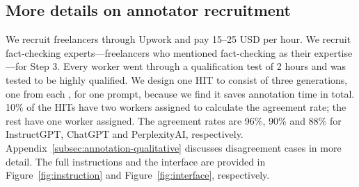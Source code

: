 \subsection{More details on annotator recruitment}\label{app:annotator-recruitment}
We recruit freelancers through Upwork and pay 15--25 USD per hour. We recruit fact-checking experts---freelancers who mentioned fact-checking as their expertise---for Step 3.
Every worker went through a qualification test of 2 hours and was tested to be highly qualified.
We design one HIT to consist of three generations, one from each \subjectLM, for one prompt, because we find it saves annotation time in total.
10\% of the HITs have two workers assigned to calculate the agreement rate; the rest have one worker assigned.
The agreement rates are 96\%, 90\% and 88\% for InstructGPT, ChatGPT and PerplexityAI, respectively. Appendix~\ref{subsec:annotation-qualitative} discusses disagreement cases in more detail.
The full instructions and the interface are provided in Figure~\ref{fig:instruction} and Figure~\ref{fig:interface}, respectively.


